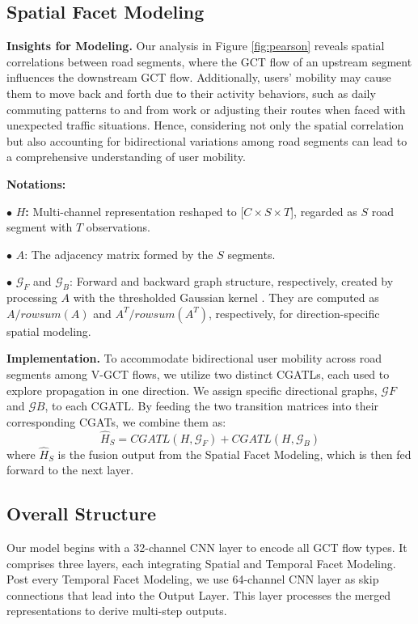 \documentclass[letterpaper]{article} %
\begin{document}
\subsection{Spatial Facet Modeling}
\noindent \textbf{Insights for Modeling.}
Our analysis in Figure \ref{fig:pearson} reveals spatial correlations between road segments, where the GCT flow of an upstream segment influences the downstream GCT flow. Additionally, users' mobility may cause them to move back and forth due to their activity behaviors, such as daily commuting patterns to and from work or adjusting their routes when faced with unexpected traffic situations. Hence, considering not only the spatial correlation but also accounting for bidirectional variations among road segments can lead to a comprehensive understanding of user mobility.

\noindent \textbf{Notations:}

$\bullet$ \textbf{$H$:} Multi-channel representation reshaped to [$C \times S \times T$], regarded as $S$ road segment with $T$ observations.

$\bullet$ $A$: The adjacency matrix formed by the $S$ segments.

$\bullet$ $\mathcal{G}_{F}$ and $\mathcal{G}_{B}$: Forward and backward graph structure, respectively, created by processing $A$ with the thresholded Gaussian kernel \cite{shuman2013emerging}. They are computed as $A/rowsum(A)$ and $A^{T}/rowsum(A^{T})$, respectively, for direction-specific spatial modeling.

\noindent \textbf{Implementation.}
To accommodate bidirectional user mobility across road segments among V-GCT flows, we utilize two distinct CGATLs, each used to explore propagation in one direction. We assign specific directional graphs, $\mathcal{G}{F}$ and $\mathcal{G}{B}$, to each CGATL. By feeding the two transition matrices into their corresponding CGATs, we combine them as:
\begin{equation}
\hat{H}_{S} = CGATL(H,\mathcal{G}_{F}) + CGATL(H,\mathcal{G}_{B})
\end{equation}
where $\hat{H}_{S}$ is the fusion output from the Spatial Facet Modeling, which is then fed forward to the next layer.

\subsection{Overall Structure}
Our model begins with a 32-channel CNN layer to encode all GCT flow types. It comprises three layers, each integrating Spatial and Temporal Facet Modeling. Post every Temporal Facet Modeling, we use 64-channel CNN layer as skip connections that lead into the Output Layer. This layer processes the merged representations to derive multi-step outputs.
\end{document}
